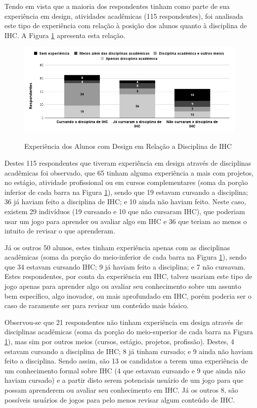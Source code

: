 Tendo em vista que a maioria dos respondentes tinham como parte de sua experiência em design, atividades acadêmicas (115 respondentes), foi analisada este tipo de experiência com relação à posição dos alunos quanto à disciplina de IHC. A Figura \ref{Fig:exp-design-disc.png} apresenta esta relação.


\begin{figure}[htbp]
	\centering
	\caption{Experiência dos Alunos com Design em Relação a Disciplina de IHC}
	\includegraphics[keepaspectratio=true,scale=0.5]{figuras/resultados/exp-design-disc.png}
	\label{Fig:exp-design-disc.png}
\end{figure}

Destes 115 respondentes que tiveram experiência em design através de disciplinas acadêmicas foi observado, que 65 tinham alguma experiência a mais com projetos, no estágio, atividade profissional ou em cursos complementares (soma da porção inferior de cada barra na Figura \ref{Fig:exp-design-disc.png}), sendo que 19 estavam cursando a disciplina; 36 já haviam feito a disciplina de IHC; e 10 ainda não haviam feito. Neste caso, existem 29 indivíduos (19 cursando e 10 que não cursaram IHC), que poderiam usar um jogo para aprender ou avaliar algo em IHC e 36 que teriam ao menos o intuito de revisar o que aprenderam.

Já os outros 50 alunos, estes tinham experiência apenas com as disciplinas acadêmicas (soma da porção do meio-inferior de cada barra na Figura \ref{Fig:exp-design-disc.png}), sendo que 34 estavam cursando IHC; 9 já haviam feito a disciplina; e 7 não cursavam. Estes respondentes, por conta da experiência em IHC, talvez usariam este tipo de jogo apenas para aprender algo ou avaliar seu conhecimento sobre um assunto bem específico, algo inovador, ou mais aprofundado em IHC, porém poderia ser o caso de raramente ser para revisar um conteúdo mais básico. 

Observou-se que 21 respondentes não tinham experiência em design através de disciplinas acadêmicas (soma da porção do meio-superior de cada barra na Figura \ref{Fig:exp-design-disc.png}), mas sim por outros meios (cursos, estágio, projetos, profissão). Destes, 4 estavam cursando a disciplina de IHC; 8 já tinham cursado; e 9 ainda não haviam feito a disciplina. Sendo assim, são 13 os candidatos a terem uma experiência de um conhecimento formal sobre IHC (4 que estavam cursando e 9 que ainda não haviam cursado) e a partir disto serem potenciais usuário de um jogo para que possam aprenderem ou avaliar seu conhecimento em IHC. Já os outros 8, são possíveis usuários de jogos para pelo menos revisar algum conteúdo de IHC.

